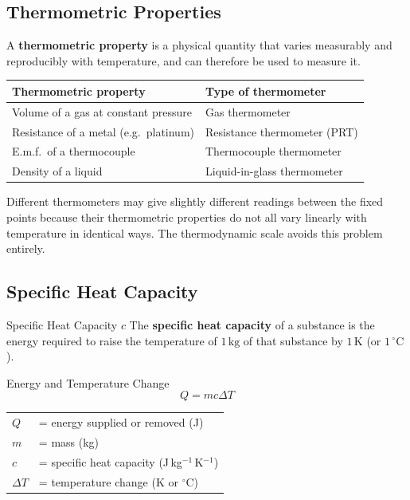 \subsection{Thermometric Properties}

A \textbf{thermometric property} is a physical quantity that varies measurably and
reproducibly with temperature, and can therefore be used to measure it.

\medskip
\begin{center}
\renewcommand{\arraystretch}{1.3}
\begin{tabular}{ll}
\toprule
\textbf{Thermometric property} & \textbf{Type of thermometer} \\
\midrule
Volume of a gas at constant pressure & Gas thermometer \\
Resistance of a metal (e.g.\ platinum) & Resistance thermometer (PRT) \\
E.m.f.\ of a thermocouple & Thermocouple thermometer \\
Density of a liquid & Liquid-in-glass thermometer \\
\bottomrule
\end{tabular}
\end{center}

\medskip
Different thermometers may give slightly different readings between the fixed points
because their thermometric properties do not all vary linearly with temperature in
identical ways. The thermodynamic scale avoids this problem entirely.

\subsection{Specific Heat Capacity}

\begin{defnbox}{Specific Heat Capacity $c$}
The \textbf{specific heat capacity} of a substance is the energy required to raise the
temperature of $1\,\mathrm{kg}$ of that substance by $1\,\mathrm{K}$
(or $1\,{}^{\circ}\mathrm{C}$).
\end{defnbox}

\begin{formulabox}{Energy and Temperature Change}
\begin{equation}
  Q = mc\Delta T
\end{equation}
\begin{tabular}{ll}
$Q$        & = energy supplied or removed (J) \\
$m$        & = mass (kg) \\
$c$        & = specific heat capacity (J\,kg$^{-1}$\,K$^{-1}$) \\
$\Delta T$ & = temperature change (K or ${}^{\circ}$C) \\
\end{tabular}
\end{formulabox}

